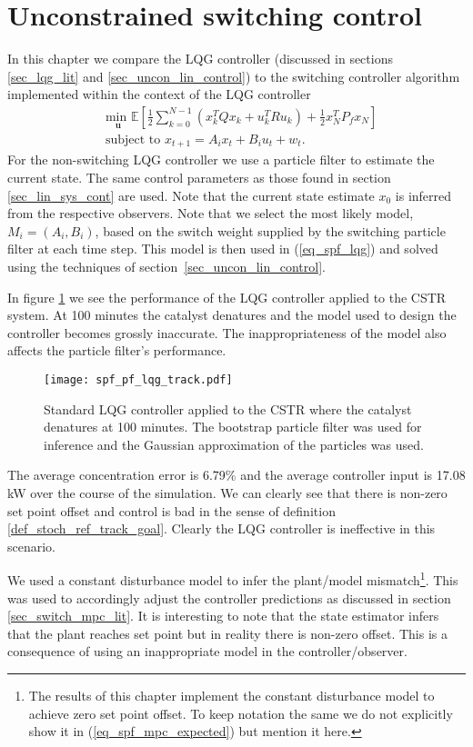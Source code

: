 \section{Unconstrained switching control}
\label{sec_spf_uncon}
In this chapter we compare the LQG controller (discussed in sections \ref{sec_lqg_lit} and \ref{sec_uncon_lin_control}) to the switching controller algorithm implemented within the context of the LQG controller
\begin{equation}
\begin{aligned}
&\underset{\mathbf{u}}{\text{min }} \mathbb{E}\left[ \frac{1}{2}\sum_{k=0}^{N-1} \left( x_k^TQx_k + u_k^TRu_k \right) + \frac{1}{2}x_N^TP_fx_N \right] \\
& \text{subject to } x_{t+1}=A_ix_t+B_iu_t + w_t.
\end{aligned}
\label{eq_spf_lqg}
\end{equation}
For the non-switching LQG controller we use a particle filter to estimate the current state. The same control parameters as those found in section \ref{sec_lin_sys_cont} are used. Note that the current state estimate $x_0$ is inferred from the respective observers. Note that we select the most likely model, $M_i=(A_i, B_i)$, based on the switch weight supplied by the switching particle filter at each time step. This model is then used in (\ref{eq_spf_lqg}) and solved using the techniques of section~\ref{sec_uncon_lin_control}.
 
In figure \ref{fig_spf_pf_lqg_track} we see the performance of the LQG controller applied to the CSTR system. At 100 minutes the catalyst denatures and the model used to design the controller becomes grossly inaccurate. The inappropriateness of the model also affects the particle filter's performance. 
\begin{figure}[H] 
\centering
\texttt{[image: spf\_pf\_lqg\_track.pdf]}
\caption{Standard LQG controller applied to the CSTR where the catalyst denatures at 100 minutes. The bootstrap particle filter was used for inference and the Gaussian approximation of the particles was used.}
\label{fig_spf_pf_lqg_track}
\end{figure}
The average concentration error is 6.79\% and the average controller input is 17.08 kW over the course of the simulation. We can clearly see that there is non-zero set point offset and control is bad in the sense of definition \ref{def_stoch_ref_track_goal}. Clearly the LQG controller is ineffective in this scenario.

We used a constant disturbance model to infer the plant/model mismatch\footnote{The results of this chapter implement the constant disturbance model to achieve zero set point offset. To keep notation the same we do not explicitly show it in (\ref{eq_spf_mpc_expected}) but mention it here.}. This was used to accordingly adjust the controller predictions as discussed in section \ref{sec_switch_mpc_lit}. It is interesting to note that the state estimator infers that the plant reaches set point but in reality there is non-zero offset. This is a consequence of using an inappropriate model in the controller/observer. 

